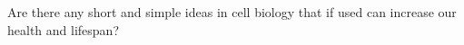 Are there any short and simple ideas in cell biology that if used can increase our health and lifespan?
